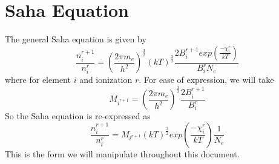\documentclass{article}
\begin{document}
	
	\newpage

	\section{Saha Equation}
		The general Saha equation is given by
		\begin{equation} \label{eq:saha_general}
			\frac{n^{r+1}_i}{n^r_i} = 
			\left( \frac{2 \pi m_e}{h^2} \right)^\frac{3}{2} (k T)^\frac{3}{2} 
				\frac{2 B^{r+1}_i exp\left(\frac{-\chi^r_i}{kT}\right)}{B^r_i N_e}
		\end{equation}
		where for element $i$ and ionization $r$. For ease of expression, we will take
		\begin{equation} \label{eq:saha_constant}
			M_{i^{r+1}} =	\left( \frac{2 \pi m_e}{h^2} \right)^\frac{3}{2}  
				\frac{2 B^{r+1}_i}{B^r_i}
		\end{equation}
		So the Saha equation is re-expressed as 
		\begin{equation} \label{eq:saha_general_revised}
			\frac{n^{r+1}_i}{n^r_i} = M_{i^{r+1}} (kT)^\frac{3}{2} 
				exp\left(\frac{-\chi^r_i}{kT}\right) \frac{1}{N_e}
		\end{equation}
		This is the form we will manipulate throughout this document.
	
\end{document}
